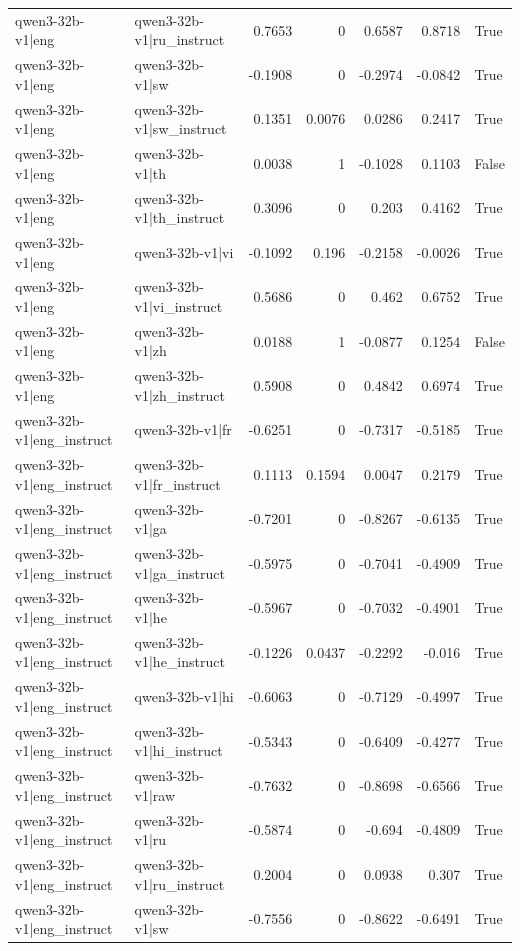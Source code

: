 \begin{table}
\begin{tabular}{l l r r r r l}
qwen3-32b-v1|eng & qwen3-32b-v1|ru_instruct & 0.7653 & 0 & 0.6587 & 0.8718 & True \\
qwen3-32b-v1|eng & qwen3-32b-v1|sw & -0.1908 & 0 & -0.2974 & -0.0842 & True \\
qwen3-32b-v1|eng & qwen3-32b-v1|sw_instruct & 0.1351 & 0.0076 & 0.0286 & 0.2417 & True \\
qwen3-32b-v1|eng & qwen3-32b-v1|th & 0.0038 & 1 & -0.1028 & 0.1103 & False \\
qwen3-32b-v1|eng & qwen3-32b-v1|th_instruct & 0.3096 & 0 & 0.203 & 0.4162 & True \\
qwen3-32b-v1|eng & qwen3-32b-v1|vi & -0.1092 & 0.196 & -0.2158 & -0.0026 & True \\
qwen3-32b-v1|eng & qwen3-32b-v1|vi_instruct & 0.5686 & 0 & 0.462 & 0.6752 & True \\
qwen3-32b-v1|eng & qwen3-32b-v1|zh & 0.0188 & 1 & -0.0877 & 0.1254 & False \\
qwen3-32b-v1|eng & qwen3-32b-v1|zh_instruct & 0.5908 & 0 & 0.4842 & 0.6974 & True \\
qwen3-32b-v1|eng_instruct & qwen3-32b-v1|fr & -0.6251 & 0 & -0.7317 & -0.5185 & True \\
qwen3-32b-v1|eng_instruct & qwen3-32b-v1|fr_instruct & 0.1113 & 0.1594 & 0.0047 & 0.2179 & True \\
qwen3-32b-v1|eng_instruct & qwen3-32b-v1|ga & -0.7201 & 0 & -0.8267 & -0.6135 & True \\
qwen3-32b-v1|eng_instruct & qwen3-32b-v1|ga_instruct & -0.5975 & 0 & -0.7041 & -0.4909 & True \\
qwen3-32b-v1|eng_instruct & qwen3-32b-v1|he & -0.5967 & 0 & -0.7032 & -0.4901 & True \\
qwen3-32b-v1|eng_instruct & qwen3-32b-v1|he_instruct & -0.1226 & 0.0437 & -0.2292 & -0.016 & True \\
qwen3-32b-v1|eng_instruct & qwen3-32b-v1|hi & -0.6063 & 0 & -0.7129 & -0.4997 & True \\
qwen3-32b-v1|eng_instruct & qwen3-32b-v1|hi_instruct & -0.5343 & 0 & -0.6409 & -0.4277 & True \\
qwen3-32b-v1|eng_instruct & qwen3-32b-v1|raw & -0.7632 & 0 & -0.8698 & -0.6566 & True \\
qwen3-32b-v1|eng_instruct & qwen3-32b-v1|ru & -0.5874 & 0 & -0.694 & -0.4809 & True \\
qwen3-32b-v1|eng_instruct & qwen3-32b-v1|ru_instruct & 0.2004 & 0 & 0.0938 & 0.307 & True \\
qwen3-32b-v1|eng_instruct & qwen3-32b-v1|sw & -0.7556 & 0 & -0.8622 & -0.6491 & True \\

\end{tabular}
\end{table}
